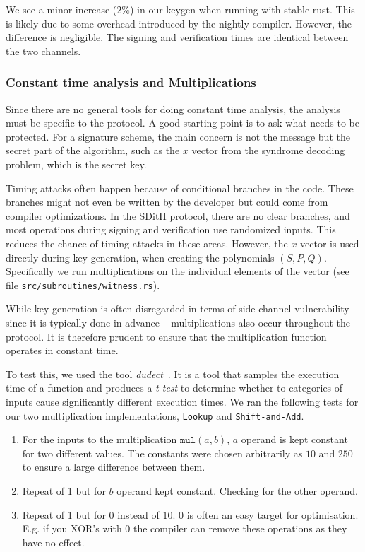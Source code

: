 \documentclass[11pt]{report}
\theoremstyle{definition}
\theoremstyle{plain}
\begin{document}
We see a minor increase ($2\%$) in our keygen when running with stable rust. This is likely due to some overhead introduced by the nightly compiler. However, the difference is negligible. The signing and verification times are identical between the two channels.

\subsubsection{Constant time analysis and Multiplications}
Since there are no general tools for doing constant time analysis, the analysis must be specific to the protocol. A good starting point is to ask what needs to be protected. For a signature scheme, the main concern is not the message but the secret part of the algorithm, such as the $x$ vector from the syndrome decoding problem, which is the secret key.

Timing attacks often happen because of conditional branches in the code. These branches might not even be written by the developer but could come from compiler optimizations. In the SDitH protocol, there are no clear branches, and most operations during signing and verification use randomized inputs. This reduces the chance of timing attacks in these areas. However, the $x$ vector is used directly during key generation, when creating the polynomials $(S, P, Q)$. Specifically we run multiplications on the individual elements of the vector (see file \texttt{src/subroutines/witness.rs}).

While key generation is often disregarded in terms of side-channel vulnerability -- since it is typically done in advance -- multiplications also occur throughout the protocol. It is therefore prudent to ensure that the multiplication function operates in constant time.

To test this, we used the tool \textit{dudect}~\cite{reparaz2017dude}. It is a tool that samples the execution time of a function and produces a \textit{t-test} to determine whether to categories of inputs cause significantly different execution times. We ran the following tests for our two multiplication implementations, \texttt{Lookup} and \texttt{Shift-and-Add}.

\begin{enumerate}
  \item For the inputs to the multiplication $\texttt{mul}(a,b)$, $a$ operand is kept constant for two different values. The constants were chosen arbitrarily as $10$ and $250$ to ensure a large difference between them.\label{dudect_test_1}
  \item Repeat of 1 but for $b$ operand kept constant. Checking for the other operand.\label{dudect_test_2}
  \item Repeat of 1 but for $0$ instead of $10$. $0$ is often an easy target for optimisation. E.g. if you XOR's with $0$ the compiler can remove these operations as they have no effect.\label{dudect_test_3}
\end{enumerate}
\end{document}
